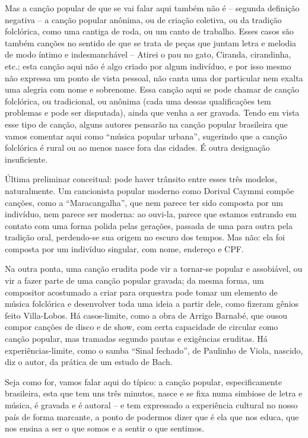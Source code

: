 Mas a canção popular de que se vai falar aqui também não é -- segunda
definição negativa -- a canção popular anônima, ou de criação coletiva,
ou da tradição folclórica, como uma cantiga de roda, ou um canto de
trabalho. Esses casos são também canções no sentido de que se trata de
peças que juntam letra e melodia de modo íntimo e indesmanchável --
Atirei o pau no gato, Ciranda, cirandinha, etc.; esta canção aqui não é
algo criado por algum indivíduo, e por isso mesmo não expressa um ponto
de vista pessoal, não canta uma dor particular nem exalta uma alegria
com nome e sobrenome. Essa canção aqui se pode chamar de canção
folclórica, ou tradicional, ou anônima (cada uma dessas qualificações
tem problemas e pode ser disputada), ainda que venha a ser gravada.
Tendo em vista esse tipo de canção, alguns autores pensarão na canção
popular brasileira que vamos comentar aqui como ``música popular
urbana'', sugerindo que a canção folclórica é rural ou ao menos nasce
fora das cidades. É outra designação insuficiente.

Última preliminar conceitual: pode haver trânsito entre esses três
modelos, naturalmente. Um cancionista popular moderno como Dorival
Caymmi compõe canções, como a ``Maracangalha'', que nem parece ter sido
composta por um indivíduo, nem parece ser moderna: ao ouvi-la, parece
que estamos entrando em contato com uma forma polida pelas gerações,
passada de uma para outra pela tradição oral, perdendo-se sua origem no
escuro dos tempos. Mas não: ela foi composta por um indivíduo singular,
com nome, endereço e CPF.

Na outra ponta, uma canção erudita pode vir a tornar-se popular e
assobiável, ou vir a fazer parte de uma canção popular gravada; da mesma
forma, um compositor acostumado a criar para orquestra pode tomar um
elemento de música folclórica e desenvolver toda uma ideia a partir
dele, como fizeram gênios feito Villa-Lobos. Há casos-limite, como a
obra de Arrigo Barnabé, que ousou compor canções de disco e de show, com
certa capacidade de circular como canção popular, mas tramadas segundo
pautas e exigências eruditas. Há experiências-limite, como o samba
``Sinal fechado'', de Paulinho de Viola, nascido, diz o autor, da
prática de um estudo de Bach.

Seja como for, vamos falar aqui do típico: a canção popular,
especificamente brasileira, esta que tem uns três minutos, nasce e se
fixa numa simbiose de letra e música, é gravada e é autoral -- e tem
expressado a experiência cultural no nosso país de forma marcante, a
ponto de podermos dizer que é ela que nos educa, que nos ensina a ser o
que somos e a sentir o que sentimos.

